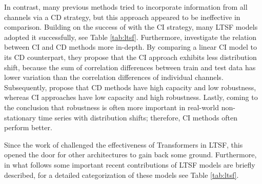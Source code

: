 \documentclass[a4paper,oneside,bibliography=totoc]{scrbook}
\begin{document}
In contrast, many previous methods \cite{zhou_informer_2021, wu_autoformer_2021, zhou_fedformer_2022} tried to incorporate information from all channels via a CD strategy, but this approach appeared to be ineffective in comparison.
Building on the success of \citet{zeng_are_2023} with the CI strategy, many LTSF models adopted it successfully, see Table \ref{tab:ltsf}.
Furthermore, \citet{han_capacity_2024} investigate the relation between CI and CD methods more in-depth. 
By comparing a linear CI model to its CD counterpart, they propose that 
the CI approach exhibits less distribution shift, because the sum of correlation differences between train and test data has lower variation than the correlation differences of individual channels. 
Subsequently, \citet{han_capacity_2024} propose that CD methods have high capacity and low robustness, whereas CI approaches have low capacity and high robustness. 
Lastly, coming to the conclusion that robustness is often more important in real-world non-stationary time series with distribution shifts; therefore, CI methods often perform better.
\newline

\noindent
Since the work of \citet{zeng_are_2023} challenged the effectiveness of Transformers in LTSF, this opened the door for other architectures to gain back some ground.
Furthermore, in what follows some important recent contributions of LTSF models are briefly described, for a detailed categorization of these models see Table \ref{tab:ltsf}.
\end{document}
